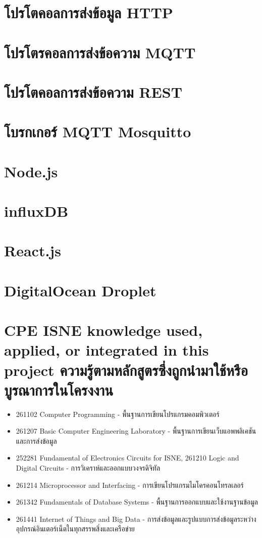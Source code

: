 \section{โปรโตคอลการส่งข้อมูล HTTP}

\section{โปรโตรคอลการส่งข้อความ MQTT}

\section{โปรโตคอลการส่งข้อความ REST}

\section{โบรกเกอร์ MQTT Mosquitto}

\section{Node.js}

\section{influxDB}

\section{React.js}

\section{DigitalOcean Droplet}

\section{\ifenglish%
\ifcpe CPE \else ISNE \fi knowledge used, applied, or integrated in this project
\else%
ความรู้ตามหลักสูตรซึ่งถูกนำมาใช้หรือบูรณาการในโครงงาน
\fi
}

\begin{itemize}
  \item 261102 Computer Programming - พื้นฐานการเขียนโปรแกรมคอมพิวเตอร์
  \item 261207 Basic Computer Engineering Laboratory - พื้นฐานการเขียนเว็บแอพพลิเคชันและการส่งข้อมูล
  \item 252281 Fundamental of Electronics Circuits for ISNE, 261210 Logic and Digital Circuits - การวิเคราห์และออกแบบวงจรดิจิทัล
  \item 261214 Microprocessor and Interfacing - การเขียนโปรแกรมไมโครคอนโทรลเลอร์
  \item 261342 Fundamentals of Database Systems - พื้นฐานการออกแบบและใช้งานฐานข้อมูล
  \item 261441 Internet of Things and Big Data - การส่งข้อมูลและรูปแบบการส่งข้อมูลระหว่างอุปกรณ์อินเตอร์เน็ตในทุกสรรพสิ่งและเครือข่าย
\end{itemize}

